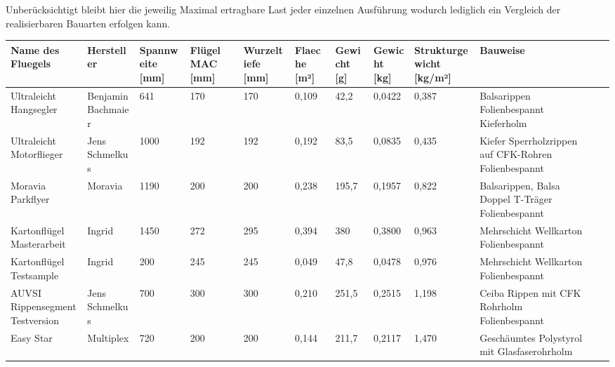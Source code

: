 Unberücksichtigt bleibt hier die jeweilig Maximal ertragbare Last jeder einzelnen Ausführung wodurch lediglich ein Vergleich der realisierbaren Bauarten erfolgen kann.
\begin{table}
\centering
\begin{adjustbox}{angle=90}
\begin{tabular}{|l|l|l|l|l|l|l|l|l|l|l|l|}
\hline
Name des Fluegels              & Hersteller         & Spannweite [mm] & Flügel MAC [mm] & Wurzeltiefe [mm] & Flaeche [m²] & Gewicht [g] & Gewicht [kg] & Strukturgewicht [kg/m²] & Bauweise \\ \hline
Ultraleicht Hangsegler         & Benjamin Bachmaier & 641             & 170              & 170              & 0,109         & 42,2        & 0,0422       & 0,387                    & Balsarippen Folienbespannt Kieferholm \\\hline
Ultraleicht Motorflieger       & Jens Schmelkus     & 1000            & 192              & 192              & 0,192         & 83,5        & 0,0835       & 0,435                    & Kiefer Sperrholzrippen auf CFK-Rohren Folienbespannt  \\\hline
Moravia Parkflyer              & Moravia            & 1190            & 200              & 200              & 0,238         & 195,7       & 0,1957       & 0,822                    & Balsarippen, Balsa Doppel T-Träger Folienbespannt         \\\hline
Kartonflügel Masterarbeit     & Ingrid             & 1450            & 272              & 295              & 0,394         & 380         & 0,3800       & 0,963                    & Mehrschicht Wellkarton Folienbespannt                            \\\hline
Kartonflügel Testsample       & Ingrid             & 200             & 245              & 245              & 0,049         & 47,8        & 0,0478       & 0,976                    & Mehrschicht Wellkarton Folienbespannt                          \\\hline
AUVSI RippensegmentTestversion & Jens Schmelkus     & 700             & 300              & 300              & 0,210         & 251,5       & 0,2515       & 1,198                    & Ceiba Rippen mit CFK Rohrholm Folienbespannt                     \\\hline
Easy Star                      & Multiplex          & 720             & 200              & 200              & 0,144         & 211,7       & 0,2117       & 1,470                    & Geschäumtes Polystyrol mit Glasfaserohrholm                     \\\hline

\end{tabular}
\end{adjustbox}
\end{table}
